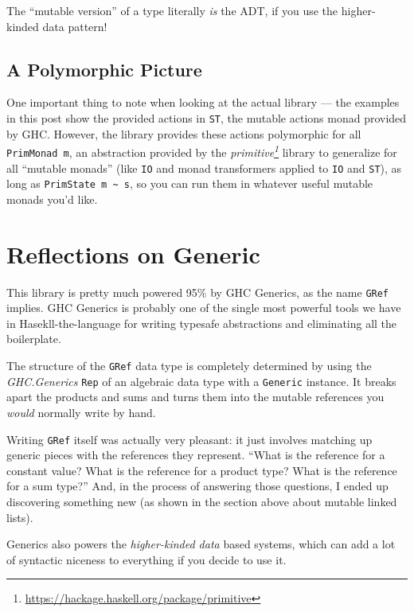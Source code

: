 \documentclass[]{article}
\renewcommand{\href}[2]{#2\footnote{\url{#1}}}
\begin{document}
The ``mutable version'' of a type literally \emph{is} the ADT, if you use the
higher-kinded data pattern!

\subsection{A Polymorphic Picture}\label{a-polymorphic-picture}

One important thing to note when looking at the actual library --- the examples
in this post show the provided actions in \texttt{ST}, the mutable actions monad
provided by GHC. However, the library provides these actions polymorphic for all
\texttt{PrimMonad\ m}, an abstraction provided by the
\emph{\href{https://hackage.haskell.org/package/primitive}{primitive}} library
to generalize for all ``mutable monads'' (like \texttt{IO} and monad
transformers applied to \texttt{IO} and \texttt{ST}), as long as
\texttt{PrimState\ m\ \textasciitilde{}\ s}, so you can run them in whatever
useful mutable monads you'd like.

\section{Reflections on Generic}\label{reflections-on-generic}

This library is pretty much powered 95\% by GHC Generics, as the name
\texttt{GRef} implies. GHC Generics is probably one of the single most powerful
tools we have in Hasekll-the-language for writing typesafe abstractions and
eliminating all the boilerplate.

The structure of the \texttt{GRef} data type is completely determined by using
the \emph{GHC.Generics} \texttt{Rep} of an algebraic data type with a
\texttt{Generic} instance. It breaks apart the products and sums and turns them
into the mutable references you \emph{would} normally write by hand.

Writing \texttt{GRef} itself was actually very pleasant: it just involves
matching up generic pieces with the references they represent. ``What is the
reference for a constant value? What is the reference for a product type? What
is the reference for a sum type?'' And, in the process of answering those
questions, I ended up discovering something new (as shown in the section above
about mutable linked lists).

Generics also powers the \emph{higher-kinded data} based systems, which can add
a lot of syntactic niceness to everything if you decide to use it.
\end{document}
